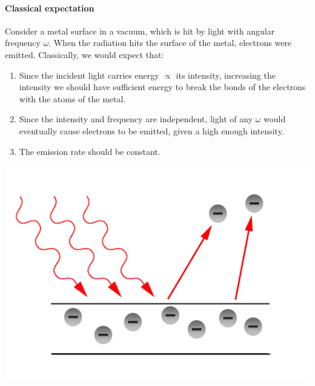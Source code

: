 \documentclass[a4paper]{article}
\begin{document}
\paragraph{Classical expectation}
Consider a metal surface in a vacuum, which is hit by light with angular frequency \( \omega \).
When the radiation hits the surface of the metal, electrons were emitted.
Classically, we would expect that:
\begin{enumerate}
	\item Since the incident light carries energy $ \propto $ its intensity, increasing the intensity we should have sufficient energy to break the bonds of the electrons with the atoms of the metal.
	\item Since the intensity and frequency are independent, light of any \( \omega \) would eventually cause electrons to be emitted, given a high enough intensity.
	\item The emission rate should be constant.
\end{enumerate}
\begin{center}
    \includegraphics[scale=0.5]{qm2.png}
\end{center}
\end{document}
